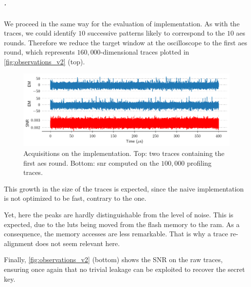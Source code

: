 \subparagraph{\aeshuitbit{}.}
We proceed in the same way for the evaluation of \aeshuitbit{} implementation.
As with the \mbedTLS{} traces, we could identify \(10\) successive patterns likely to correspond to the \(10\) \gls{aes} rounds.
Therefore we reduce the target window at the oscilloscope to the first \gls{aes} round, which represents \(160,000\)-dimensional traces plotted in \autoref{fig:observations_v2} (top).
\begin{figure}[t]
	\centering
	\includegraphics[width=\textwidth]{CLAPS/v2/snr_raw}
	\caption{Acquisitions on the \aeshuitbit{} implementation.
	Top: two traces containing the first \gls{aes} round.
	Bottom: \gls{snr} computed on the \(100,000\) profiling traces.}
	\label{fig:observations_v2}
\end{figure}
This growth in the size of the traces is expected, since the naive \aeshuitbit{} implementation is not optimized to be fast, contrary to the \mbedTLS{} one.

Yet, here the peaks are hardly distinguishable from the level of noise.
This is expected, due to the \glspl{lut} being moved from the flash memory to the \gls{ram}.
As a consequence, the memory accesses are less remarkable.
That is why a trace re-alignment does not seem relevant here.

Finally, \autoref{fig:observations_v2} (bottom) shows the SNR on the raw traces, ensuring once again that no trivial leakage can be exploited to recover the secret key.